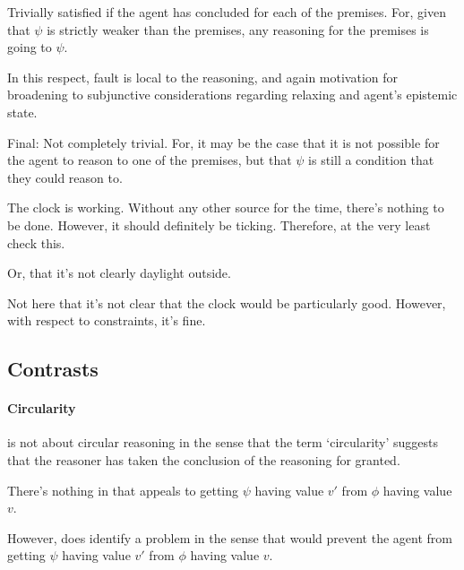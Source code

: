 \begin{note}
  Trivially satisfied if the agent has concluded for each of the premises.
  For, given that \(\psi\) is strictly weaker than the premises, any reasoning for the premises is going to \indicateV{} \(\psi\).

  In this respect, fault is local to the reasoning, and again motivation for broadening to subjunctive considerations regarding relaxing and agent's epistemic state.

  Final: Not completely trivial.
  For, it may be the case that it is not possible for the agent to reason to one of the premises, but that \(\psi\) is still a condition that they could reason to.
\end{note}

\begin{note}
  \begin{illustration}
    The clock is working.
    Without any other source for the time, there's nothing to be done.
    However, it should definitely be ticking.
    Therefore, at the very least check this.
  \end{illustration}
  Or, that it's not clearly daylight outside.

  Not here that it's not clear that the clock would be particularly good.
  However, with respect to constraints, it's fine.
\end{note}

\newpage

\subsection{Contrasts}
\label{sec:contrasts}

\paragraph{Circularity}

\begin{note}
  \ideaCS{} is not about circular reasoning in the sense that the term `circularity' suggests that the reasoner has taken the conclusion of the reasoning for granted.

  There's nothing in \ideaCS{} that appeals to getting \(\psi\) having value \(v'\) from \(\phi\) having value \(v\).

  However, does identify a problem in the sense that would prevent the agent from getting \(\psi\) having value \(v'\) from \(\phi\) having value \(v\).
\end{note}

